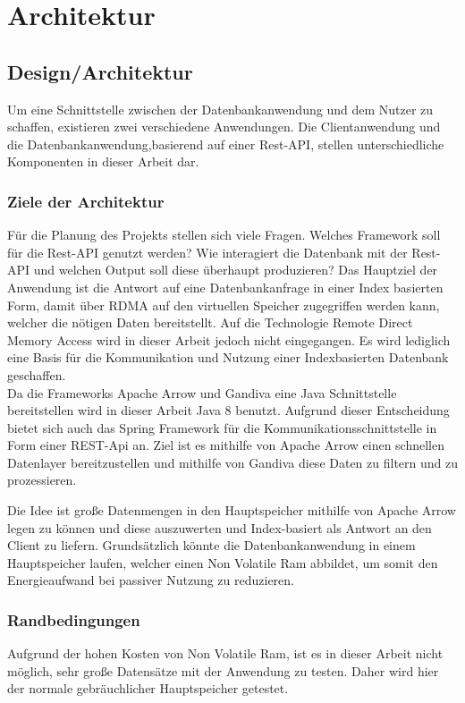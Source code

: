 \chapter{Architektur}
\label{Architektur}

\section{Design/Architektur}
Um eine Schnittstelle zwischen der Datenbankanwendung und dem Nutzer zu schaffen, existieren zwei verschiedene Anwendungen. Die Clientanwendung und die Datenbankanwendung,basierend auf einer Rest-API, stellen unterschiedliche Komponenten in dieser Arbeit dar.

\subsection{Ziele der Architektur}

Für die Planung des Projekts stellen sich viele Fragen. Welches Framework soll für die Rest-API genutzt werden? Wie interagiert die Datenbank mit der Rest-API und welchen Output soll diese überhaupt produzieren?
Das Hauptziel der Anwendung ist die Antwort auf eine Datenbankanfrage in einer Index basierten Form, damit über RDMA auf den virtuellen Speicher zugegriffen werden kann, welcher die nötigen Daten bereitstellt.
Auf die Technologie Remote Direct Memory Access wird in dieser Arbeit jedoch nicht eingegangen. Es wird lediglich eine Basis für die Kommunikation und Nutzung einer Indexbasierten Datenbank geschaffen.
\\
Da die Frameworks Apache Arrow und Gandiva eine Java Schnittstelle bereitstellen wird in dieser Arbeit Java 8 benutzt. 
Aufgrund dieser Entscheidung bietet sich auch das Spring Framework für die Kommunikationsschnittstelle in Form einer REST-Api an.
Ziel ist es mithilfe von Apache Arrow einen schnellen Datenlayer bereitzustellen und mithilfe von Gandiva diese Daten zu filtern und zu prozessieren.

Die Idee ist große Datenmengen in den Hauptspeicher mithilfe von Apache Arrow  legen zu können und diese auszuwerten und Index-basiert als Antwort an den Client zu liefern. Grundsätzlich könnte die Datenbankanwendung in einem Hauptspeicher laufen, welcher einen Non Volatile Ram abbildet, um somit den Energieaufwand bei passiver Nutzung zu reduzieren.

\subsection{Randbedingungen}
Aufgrund der hohen Kosten von Non Volatile Ram, ist es in dieser Arbeit nicht möglich, sehr große Datensätze mit der Anwendung zu testen. Daher wird hier der normale gebräuchlicher Hauptspeicher getestet.

